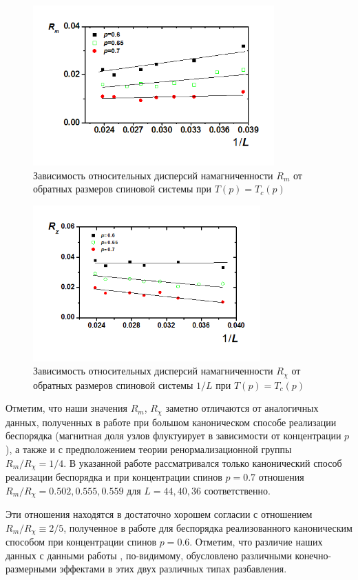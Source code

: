 \begin{figure}[H]
	\centering
	\includegraphics[width=0.5\linewidth]{content/sections/images/phys2-1}
	\caption{Зависимость относительных дисперсий намагниченности $R_m$ от обратных размеров спиновой системы при $T(p)=T_c(p)$}
	\label{phys2-pic-2}
\end{figure}

\begin{figure}[H]
	\centering
	\includegraphics[width=0.5\linewidth]{content/sections/images/phys2-2}
	\caption{Зависимость относительных дисперсий намагниченности $R_{\chi}$ от обратных размеров спиновой системы $1/L$ при $T(p)=T_c(p)$}
	\label{phys2-pic-3}
\end{figure}


Отметим, что наши значения $R_m$, $R_\chi$ заметно отличаются от аналогичных данных, полученных в работе \cite{ph2_4} при большом каноническом способе реализации беспорядка (магнитная доля узлов флуктуирует в зависимости от концентрации $p$), а также и с предположением теории ренормализационной группы  $R_m / R_\chi = 1/4$. В указанной работе рассматривался только канонический способ реализации беспорядка и при концентрации спинов $p=0.7$ отношения $R_m / R_\chi =0.502, 0.555, 0.559$ для $L=44, 40, 36$ соответственно.

Эти отношения находятся в достаточно хорошем согласии с отношением \linebreak $R_m / R_\chi \equiv 2/5$, полученное в работе \cite{ph2_1} для беспорядка реализованного каноническим способом при концентрации спинов $p=0.6$. Отметим, что различие наших данных с данными работы \cite{ph2_4}, по-видимому, обусловлено различными конечно-размерными эффектами в этих двух различных типах разбавления.


